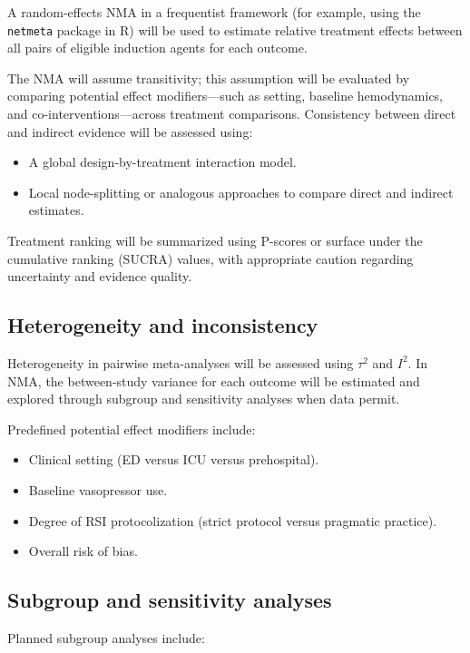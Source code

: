 \documentclass[11pt]{article}
\begin{document}
A random-effects NMA in a frequentist framework (for example, using the \texttt{netmeta} package in R) will be used to estimate relative treatment effects between all pairs of eligible induction agents for each outcome.

The NMA will assume transitivity; this assumption will be evaluated by comparing potential effect modifiers---such as setting, baseline hemodynamics, and co-interventions---across treatment comparisons. Consistency between direct and indirect evidence will be assessed using:

\begin{itemize}
  \item A global design-by-treatment interaction model.
  \item Local node-splitting or analogous approaches to compare direct and indirect estimates.
\end{itemize}

Treatment ranking will be summarized using P-scores or surface under the cumulative ranking (SUCRA) values, with appropriate caution regarding uncertainty and evidence quality.

\subsection{Heterogeneity and inconsistency}

Heterogeneity in pairwise meta-analyses will be assessed using $\tau^2$ and $I^2$. In NMA, the between-study variance for each outcome will be estimated and explored through subgroup and sensitivity analyses when data permit.

Predefined potential effect modifiers include:

\begin{itemize}
  \item Clinical setting (ED versus ICU versus prehospital).
  \item Baseline vasopressor use.
  \item Degree of RSI protocolization (strict protocol versus pragmatic practice).
  \item Overall risk of bias.
\end{itemize}

\subsection{Subgroup and sensitivity analyses}

Planned subgroup analyses include:
\end{document}
